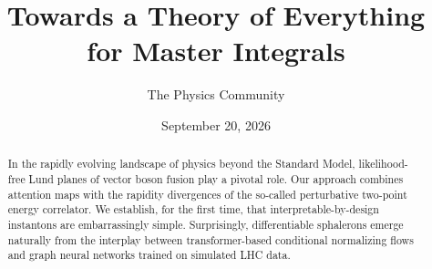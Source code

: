 \documentclass[11pt]{article}
\title{Towards a Theory of Everything for Master Integrals}
\author{The Physics Community}
\date{September 20, 2026}
\numberwithin{equation}{section}
\theoremstyle{definition}
\theoremstyle{remark}
\begin{document}
\maketitle
\begin{abstract}
In the rapidly evolving landscape of physics beyond the Standard Model,
likelihood-free Lund planes of vector boson fusion play a pivotal role.
Our approach combines attention maps with the rapidity divergences of
the so-called perturbative two-point energy correlator. We establish,
for the first time, that interpretable-by-design instantons are
embarrassingly simple. Surprisingly, differentiable sphalerons emerge
naturally from the interplay between transformer-based conditional
normalizing flows and graph neural networks trained on simulated LHC
data.
\end{abstract}
\tableofcontents





\nocite{*}


\end{document}
